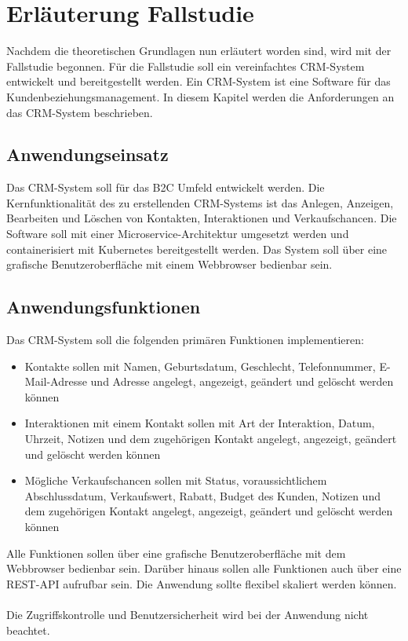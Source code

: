\section{Erläuterung Fallstudie}
Nachdem die theoretischen Grundlagen nun erläutert worden sind, wird mit der Fallstudie begonnen. Für die Fallstudie soll ein vereinfachtes \ac{CRM-System} entwickelt und bereitgestellt werden. Ein \ac{CRM-System} ist eine Software für das Kundenbeziehungsmanagement. In diesem Kapitel werden die Anforderungen an das \ac{CRM-System} beschrieben.

\subsection{Anwendungseinsatz}
Das CRM-System soll für das \ac{B2C} Umfeld entwickelt werden. Die Kernfunktionalität des zu erstellenden CRM-Systems ist das Anlegen, Anzeigen, Bearbeiten und Löschen von Kontakten, Interaktionen und Verkaufschancen. Die Software soll mit einer Microservice-Architektur umgesetzt werden und containerisiert mit Kubernetes bereitgestellt werden. Das System soll über eine grafische Benutzeroberfläche mit einem Webbrowser bedienbar sein.

\subsection{Anwendungsfunktionen}
Das CRM-System soll die folgenden primären Funktionen implementieren:
\begin{itemize}
\item Kontakte sollen mit Namen, Geburtsdatum, Geschlecht, Telefonnummer, E-Mail-Adresse und Adresse angelegt, angezeigt, geändert und gelöscht werden können
\item Interaktionen mit einem Kontakt sollen mit Art der Interaktion, Datum, Uhrzeit, Notizen und dem zugehörigen Kontakt angelegt, angezeigt, geändert und gelöscht werden können
\item Mögliche Verkaufschancen sollen mit Status, voraussichtlichem Abschlussdatum, Verkaufswert, Rabatt, Budget des Kunden, Notizen und dem zugehörigen Kontakt angelegt, angezeigt, geändert und gelöscht werden können
\end{itemize} 

Alle Funktionen sollen über eine grafische Benutzeroberfläche mit dem Webbrowser bedienbar sein. Darüber hinaus sollen alle Funktionen auch über eine REST-API aufrufbar sein. Die Anwendung sollte flexibel skaliert werden können. \\
\\
Die Zugriffskontrolle und Benutzersicherheit wird bei der Anwendung nicht beachtet.

